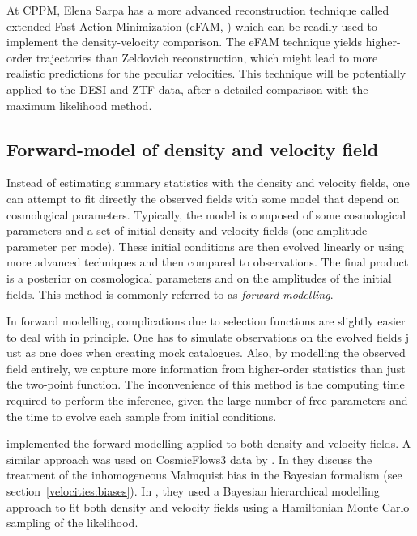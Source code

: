     At CPPM, Elena Sarpa has a more advanced reconstruction technique 
    called extended Fast Action Minimization (eFAM, \cite{sarpaExtendedFastAction2021})
    which can be readily used to implement the density-velocity comparison.
    The eFAM technique yields higher-order trajectories than 
    Zeldovich reconstruction, which might lead to more realistic 
    predictions for the peculiar velocities. 
    This technique will be potentially applied to the DESI and ZTF data,
    after a detailed comparison with the maximum likelihood method. 


    \subsection{Forward-model of density and velocity field}
    \label{velocities:methods:forward}

    Instead of estimating summary statistics with the density and velocity fields, 
    one can attempt to fit directly the observed fields with some model 
    that depend on cosmological parameters. Typically, the model is composed 
    of some cosmological parameters and a set of initial density and velocity fields
    (one amplitude parameter per mode). These initial conditions are then evolved 
    linearly or using more advanced techniques and then compared to observations. 
    The final product is a posterior on cosmological parameters and on the amplitudes 
    of the initial fields. This method is commonly referred to as \emph{forward-modelling}. 

    In forward modelling, complications due to selection functions are slightly easier 
    to deal with in principle. One has to simulate observations on the evolved fields j
    ust as one does when creating mock catalogues. 
    Also, by modelling the observed field entirely, we capture 
    more information from higher-order statistics than just the two-point function. 
    The inconvenience of this method is the computing time required to perform the inference,
    given the large number of free parameters and the time to evolve each sample from initial conditions. 
    
    \cite{lavauxBayesian3DVelocity2016} implemented the forward-modelling applied to 
    both density and velocity fields. A similar approach was used on CosmicFlows3 data 
    by \cite{grazianiPeculiarVelocityField2019}. In \cite{boruahReconstructingDarkMatter2021}
    they discuss the treatment of the inhomogeneous Malmquist bias in the Bayesian formalism 
    (see section~\ref{velocities:biases}).
    In \cite{prideaux-gheeFieldbasedPhysicalInference2023}, they used a Bayesian hierarchical modelling 
    approach to fit both density and velocity fields using a Hamiltonian Monte Carlo sampling of the 
    likelihood. 

